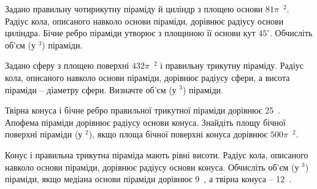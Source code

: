 \documentclass[12pt]{article}
\begin{document}
\begin{samepage}
\noindent\zadnum Задано правильну чотирикутну піраміду й циліндр з площею основи $81\pi$~$^2$. Радіус кола, описаного навколо основи піраміди, дорівнює радіусу основи циліндра. Бічне ребро піраміди утворює з площиною її основи кут $45^\circ$. Обчисліть об’єм (у $^3$) піраміди. 

\nmtnobreak
\nopagebreak\nbvspace{0.5cm}
\nmtAnswerBox
\par{}
\end{samepage}

\begin{samepage}
\noindent\zadnum Задано сферу з площею поверхні $432\pi$~$^2$ і правильну трикутну піраміду. Радіус кола, описаного навколо основи піраміди, дорівнює радіусу сфери, а висота піраміди – діаметру сфери. Визначте об’єм (у $^3$) піраміди. 

\nmtnobreak
\nopagebreak\nbvspace{0.5cm}
\nmtAnswerBox
\par{}
\end{samepage}

\begin{samepage}
\noindent\zadnum Твірна конуса і бічне ребро правильної трикутної піраміди дорівнює 25~. Апофема піраміди дорівнює радіусу основи конуса. Знайдіть площу бічної поверхні піраміди (у $^2$), якщо площа бічної поверхні конуса дорівнює $500\pi$~$^2$. 

\nmtnobreak
\nopagebreak\nbvspace{0.5cm}
\nmtAnswerBox
\par{}
\end{samepage}

\begin{samepage}
\noindent\zadnum Конус і правильна трикутна піраміда мають рівні висоти. Радіус кола, описаного навколо основи піраміди, дорівнює радіусу основи конуса. Обчисліть об’єм (у $^3$) піраміди, якщо медіана основи піраміди дорівнює 9~, а твірна конуса – 12~. 

\nmtnobreak
\nopagebreak\nbvspace{0.5cm}
\nmtAnswerBox
\par{}
\end{samepage}
\end{document}

